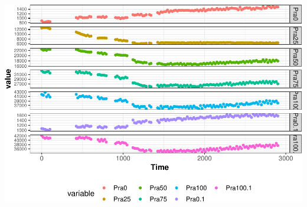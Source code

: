 \documentclass[12pt,twoside]{reedthesis}
\begin{document}
  \begin{center}\includegraphics{tesis_files/figure-latex/Cinetics-6} \end{center}
  
\end{document}
